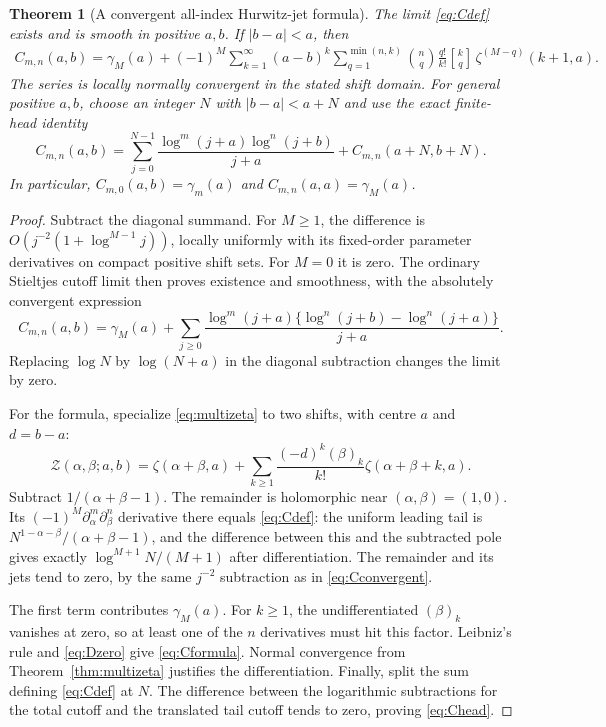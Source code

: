 \documentclass[11pt,a4paper]{article}
\numberwithin{equation}{section}
\newtheorem{theorem}{Theorem}[section]
\theoremstyle{definition}\newtheorem{definition}[theorem]{Definition}
\theoremstyle{remark}\newtheorem{remark}[theorem]{Remark}
\newcommand{\stir}[2]{\genfrac{[}{]}{0pt}{}{#1}{#2}}
\begin{document}
\begin{theorem}[A convergent all-index Hurwitz-jet formula]
\label{thm:cutoff}
The limit \eqref{eq:Cdef} exists and is smooth in positive $a,b$.
If $|b-a|<a$, then
\begin{align}
 C_{m,n}(a,b)=\gamma_M(a)+(-1)^M
   \sum_{k=1}^\infty (a-b)^k
    \sum_{q=1}^{\min(n,k)}\binom nq
       \frac{q!}{k!}\stir{k}{q}\,
                \zeta^{(M-q)}(k+1,a).
 \label{eq:Cformula}
\end{align}
The series is locally normally convergent in the stated shift domain.
For general positive $a,b$, choose an integer $N$ with
$|b-a|<a+N$ and use the exact finite-head identity
\begin{equation}
 C_{m,n}(a,b)=\sum_{j=0}^{N-1}
          \frac{\log^m(j+a)\log^n(j+b)}{j+a}
                       +C_{m,n}(a+N,b+N).
 \label{eq:Chead}
\end{equation}
In particular, $C_{m,0}(a,b)=\gamma_m(a)$ and
$C_{m,n}(a,a)=\gamma_M(a)$.
\end{theorem}
\begin{proof}
Subtract the diagonal summand. For $M\ge1$, the difference is
$O(j^{-2}(1+\log^{M-1}j))$, locally uniformly with its fixed-order
parameter derivatives on compact positive shift sets. For $M=0$ it
is zero. The ordinary Stieltjes cutoff limit then proves existence and
smoothness, with the absolutely convergent expression
\begin{equation}
 C_{m,n}(a,b)=\gamma_M(a)+\sum_{j\ge0}
   \frac{\log^m(j+a)\{\log^n(j+b)-\log^n(j+a)\}}{j+a}.
 \label{eq:Cconvergent}
\end{equation}
Replacing $\log N$ by $\log(N+a)$ in the diagonal subtraction changes
the limit by zero.

For the formula, specialize \eqref{eq:multizeta} to two shifts, with
centre $a$ and $d=b-a$:
\begin{equation}
 \mathcal Z(\alpha,\beta;a,b)
   =\zeta(\alpha+\beta,a)+
       \sum_{k\ge1}\frac{(-d)^k(\beta)_k}{k!}
                         \zeta(\alpha+\beta+k,a).
 \label{eq:twozeta}
\end{equation}
Subtract $1/(\alpha+\beta-1)$. The remainder is holomorphic near
$(\alpha,\beta)=(1,0)$. Its
$(-1)^M\partial_\alpha^m\partial_\beta^n$ derivative there equals
\eqref{eq:Cdef}: the uniform leading tail is
$N^{1-\alpha-\beta}/(\alpha+\beta-1)$, and the difference between
this and the subtracted pole gives exactly
$\log^{M+1}N/(M+1)$ after differentiation. The remainder and its jets
tend to zero, by the same $j^{-2}$ subtraction as in
\eqref{eq:Cconvergent}.

The first term contributes $\gamma_M(a)$. For $k\ge1$, the
undifferentiated $(\beta)_k$ vanishes at zero, so at least one of the
$n$ derivatives must hit this factor. Leibniz's rule and
\eqref{eq:Dzero} give \eqref{eq:Cformula}. Normal convergence from
Theorem~\ref{thm:multizeta} justifies the differentiation. Finally,
split the sum defining \eqref{eq:Cdef} at $N$. The difference between
the logarithmic subtractions for the total cutoff and the translated
tail cutoff tends to zero, proving \eqref{eq:Chead}.
\end{proof}
\end{document}
